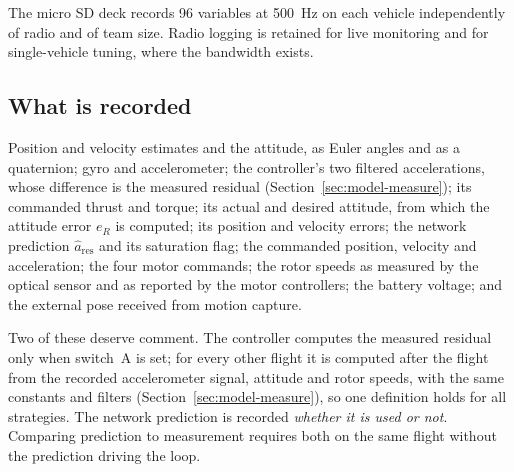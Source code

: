 The micro SD deck records \num{96} variables at \SI{500}{\hertz} on each vehicle independently of
radio and of team size. Radio logging is retained for live monitoring and for single-vehicle
tuning, where the bandwidth exists.

\subsection{What is recorded}
\label{sec:setup-recorded}

Position and velocity estimates and the attitude, as Euler angles and as a quaternion; gyro and
accelerometer; the controller's two filtered accelerations, whose difference is the measured
residual (Section~\ref{sec:model-measure}); its commanded thrust and torque; its actual and desired
attitude, from which the attitude error $e_R$ is computed; its position and velocity errors; the
network prediction $\hat{a}_{\mathrm{res}}$ and its saturation flag; the commanded position,
velocity and acceleration; the four motor commands; the rotor speeds as measured by the optical
sensor and as reported by the motor controllers; the battery voltage; and the external pose
received from motion capture.

Two of these deserve comment. The controller computes the measured residual only when switch~A is
set; for every other flight it is computed after the flight from the recorded accelerometer signal,
attitude and rotor speeds, with the same constants and filters (Section~\ref{sec:model-measure}),
so one definition holds for all strategies. The network prediction is recorded \emph{whether it is
used or not}. Comparing prediction to measurement requires both on the same flight without the
prediction driving the loop.

